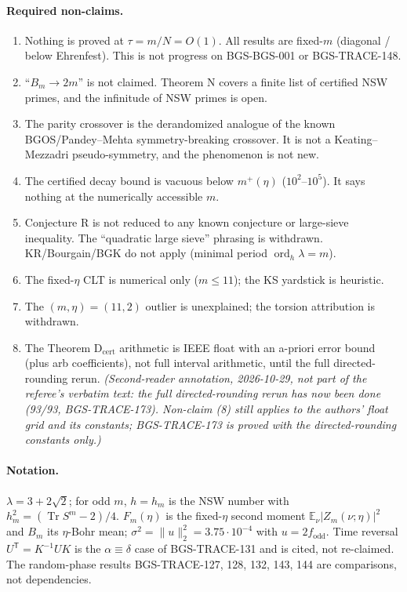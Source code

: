 \paragraph{Required non-claims.}
\begin{enumerate}[label=(\arabic*)]
\item Nothing is proved at \(\tau=m/N=O(1)\). All results are fixed-\(m\) (diagonal / below Ehrenfest). This is not progress on BGS-BGS-001 or BGS-TRACE-148.
\item ``\(B_m\to 2m\)'' is not claimed. Theorem N covers a finite list of certified NSW primes, and the infinitude of NSW primes is open.
\item The parity crossover is the derandomized analogue of the known BGOS/Pandey--Mehta symmetry-breaking crossover. It is not a Keating--Mezzadri pseudo-symmetry, and the phenomenon is not new.
\item The certified decay bound is vacuous below \(m^+(\eta)\) (\(10^2\)--\(10^5\)). It says nothing at the numerically accessible \(m\).
\item Conjecture R is not reduced to any known conjecture or large-sieve inequality. The ``quadratic large sieve'' phrasing is withdrawn. KR/Bourgain/BGK do not apply (minimal period \(\operatorname{ord}_h\lambda=m\)).
\item The fixed-\(\eta\) CLT is numerical only (\(m\le 11\)); the KS yardstick is heuristic.
\item The \((m,\eta)=(11,2)\) outlier is unexplained; the torsion attribution is withdrawn.
\item The Theorem D\(_{\mathrm{cert}}\) arithmetic is IEEE float with an a-priori error bound (plus arb coefficients), not full interval arithmetic, until the full directed-rounding rerun. \emph{(Second-reader annotation, 2026-10-29, not part of the referee's verbatim text: the full directed-rounding rerun has now been done (93/93, BGS-TRACE-173). Non-claim (8) still applies to the authors' float grid and its constants; BGS-TRACE-173 is proved with the directed-rounding constants only.)}
\end{enumerate}

\paragraph{Notation.} \(\lambda=3+2\sqrt2\); for odd \(m\), \(h=h_m\) is the NSW number with
\(h_m^2=(\operatorname{Tr}S^m-2)/4\). \(F_m(\eta)\) is the fixed-\(\eta\) second moment
\(\mathbb E_\nu\lvert Z_m(\nu;\eta)\rvert^2\) and \(B_m\) its \(\eta\)-Bohr mean;
\(\sigma^2=\lVert u\rVert_2^2=3.75\cdot10^{-4}\) with \(u=2f_{\mathrm{odd}}\).
Time reversal \(U^{\mathsf T}=K^{-1}UK\) is the \(\alpha\equiv\delta\) case of BGS-TRACE-131 and is cited, not re-claimed.
The random-phase results BGS-TRACE-127, 128, 132, 143, 144 are comparisons, not dependencies.

